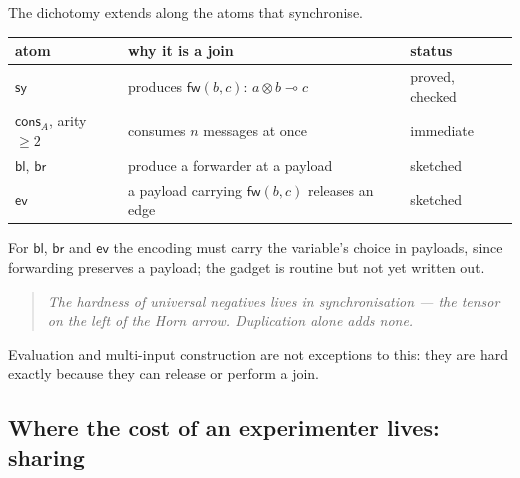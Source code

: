 \documentclass[11pt]{article}
\theoremstyle{definition}
\theoremstyle{plain}
\theoremstyle{remark}
\newcommand{\cfw}{\mathsf{fw}}
\newcommand{\csy}{\mathsf{sy}}
\newcommand{\cbl}{\mathsf{bl}}
\newcommand{\cbr}{\mathsf{br}}
\newcommand{\cev}{\mathsf{ev}}
\newcommand{\ccons}{\mathsf{cons}}
\begin{document}
The dichotomy extends along the atoms that synchronise.

\begin{center}
\begin{tabular}{@{}lll@{}}
\toprule
atom & why it is a join & status \\
\midrule
$\csy$ & produces $\cfw(b,c)$: $a \otimes b \multimap c$ & proved, checked \\
$\ccons_A$, arity $\ge 2$ & consumes $n$ messages at once & immediate \\
$\cbl$, $\cbr$ & produce a forwarder at a payload & sketched \\
$\cev$ & a payload carrying $\cfw(b,c)$ releases an edge & sketched \\
\bottomrule
\end{tabular}
\end{center}

\noindent
For $\cbl$, $\cbr$ and $\cev$ the encoding must carry the variable's
choice in payloads, since forwarding preserves a payload; the gadget is
routine but not yet written out.

\begin{quote}
\itshape The hardness of universal negatives lives in synchronisation ---
the tensor on the left of the Horn arrow. Duplication alone adds none.
\end{quote}

\noindent
Evaluation and multi-input construction are not exceptions to this: they
are hard exactly because they can release or perform a join.

\subsection{Where the cost of an experimenter lives: sharing}\label{sec:sharing}
\end{document}
